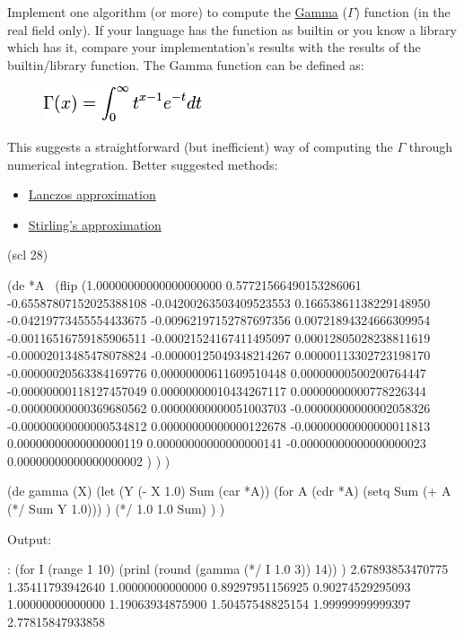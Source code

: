 Implement one algorithm (or more) to compute the
\href{http://en.wikipedia.org/wiki/Gamma\_function}{Gamma} ($\Gamma$) function
(in the real field only). If your language has the function as builtin
or you know a library which has it, compare your implementation's
results with the results of the builtin/library function. The Gamma
function can be defined as:

\begin{figure}[htbp]
\centering
\includegraphics[scale=.6]{graphics/65e69cb6ea91c1602e057eca6ef99337.png}
\end{figure}

This suggests a straightforward (but inefficient) way of computing the $\Gamma$
through numerical integration. Better suggested methods:

\begin{itemize}
\item
  \href{http://en.wikipedia.org/wiki/Lanczos\_approximation}{Lanczos
  approximation}
\item
  \href{http://en.wikipedia.org/wiki/Stirling\%27s\_approximation}{Stirling's
  approximation}
\end{itemize}


\begin{wideverbatim}

(scl 28)

(de *A
   ~(flip
      (1.00000000000000000000  0.57721566490153286061 -0.65587807152025388108
      -0.04200263503409523553  0.16653861138229148950 -0.04219773455554433675
      -0.00962197152787697356  0.00721894324666309954 -0.00116516759185906511
      -0.00021524167411495097  0.00012805028238811619 -0.00002013485478078824
      -0.00000125049348214267  0.00000113302723198170 -0.00000020563384169776
       0.00000000611609510448  0.00000000500200764447 -0.00000000118127457049
       0.00000000010434267117  0.00000000000778226344 -0.00000000000369680562
       0.00000000000051003703 -0.00000000000002058326 -0.00000000000000534812
       0.00000000000000122678 -0.00000000000000011813  0.00000000000000000119
       0.00000000000000000141 -0.00000000000000000023  0.00000000000000000002 ) ) )

(de gamma (X)
   (let (Y (- X 1.0)  Sum (car *A))
      (for A (cdr *A)
         (setq Sum (+ A (*/ Sum Y 1.0))) )
      (*/ 1.0 1.0 Sum) ) )

Output:

: (for I (range 1 10)
   (prinl (round (gamma (*/ I 1.0 3)) 14)) )
2.67893853470775
1.35411793942640
1.00000000000000
0.89297951156925
0.90274529295093
1.00000000000000
1.19063934875900
1.50457548825154
1.99999999999397
2.77815847933858

\end{wideverbatim}

